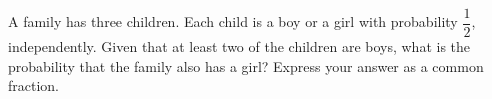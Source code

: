 A family has three children. Each child is a boy or a girl with probability $\dfrac{1}{2}$, independently. Given that at least two of the children are boys, what is the probability that the family also has a girl? Express your answer as a common fraction.
